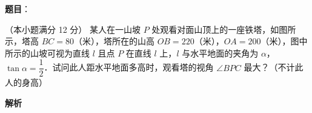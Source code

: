 \begin{answer}



\end{answer}
\begin{answer}

\textbf{题目}：

（本小题满分 12 分）
某人在一山坡 $P$ 处观看对面山顶上的一座铁塔，如图所示，塔高 $BC = 80$（米），塔所在的山高 $OB = 220$（米），$OA = 200$（米），图中所示的山坡可视为直线 $l$ 且点 $P$ 在直线 $l$ 上，$l$ 与水平地面的夹角为 $\alpha$，$\tan\alpha = \dfrac{1}{2}$．试问此人距水平地面多高时，观看塔的视角 $\angle BPC$ 最大？（不计此人的身高）
\nopagebreak[4]
\begin{center}\end{center}
\nopagebreak[4]
\textbf{解析}


\end{answer}
